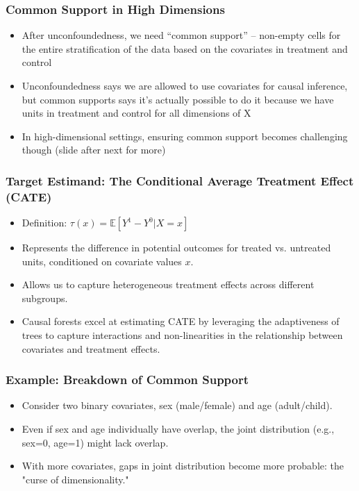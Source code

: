 \documentclass{beamer}
\begin{document}
\begin{frame}
\frametitle{Common Support in High Dimensions}
\begin{itemize}
	\item After unconfoundedness, we need ``common support'' -- non-empty cells for the entire stratification of the data based on the covariates in treatment and control
	\item Unconfoundedness says we are allowed to use covariates for causal inference, but common supports says it's actually possible to do it because we have units in treatment and control for all dimensions of X
    \item In high-dimensional settings, ensuring common support becomes challenging though (slide after next for more)
\end{itemize}
\end{frame}

\begin{frame}
\frametitle{Target Estimand: The Conditional Average Treatment Effect (CATE)}
\begin{itemize}
    \item Definition: \( \tau(x) = \mathbb{E}[Y^1 - Y^0 | X = x] \)
    \item Represents the difference in potential outcomes for treated vs. untreated units, conditioned on covariate values \(x\).
    \item Allows us to capture heterogeneous treatment effects across different subgroups.
    \item Causal forests excel at estimating CATE by leveraging the adaptiveness of trees to capture interactions and non-linearities in the relationship between covariates and treatment effects.
\end{itemize}
\end{frame}


\begin{frame}
\frametitle{Example: Breakdown of Common Support}
\begin{itemize}
    \item Consider two binary covariates, sex (male/female) and age (adult/child).
    \item Even if sex and age individually have overlap, the joint distribution (e.g., sex=0, age=1) might lack overlap.
    \item With more covariates, gaps in joint distribution become more probable: the "curse of dimensionality."
\end{itemize}
\end{frame}
\end{document}
